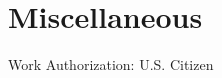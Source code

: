 \documentclass[letterpaper]{scrartcl}
\begin{document}
\section*{Miscellaneous}
\begin{list1}
\item
  \begin{list2}
  \item Work Authorization: U.S. Citizen
  \end{list2}
\end{list1}
\end{document}
